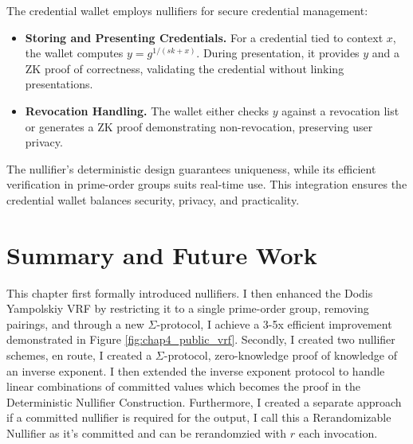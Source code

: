 The credential wallet employs nullifiers for secure credential management:

\begin{itemize}
    \item \textbf{Storing and Presenting Credentials.} For a credential tied to context $x$, the wallet computes $y = g^{1/(sk + x)}$. During presentation, it provides $y$ and a ZK proof of correctness, validating the credential without linking presentations.
    \item \textbf{Revocation Handling.} The wallet either checks $y$ against a revocation list or generates a ZK proof demonstrating non-revocation, preserving user privacy.
\end{itemize}

The nullifier’s deterministic design guarantees uniqueness, while its efficient verification in prime-order groups suits real-time use. This integration ensures the credential wallet balances security, privacy, and practicality.


\section{Summary and Future Work}

This chapter first formally introduced nullifiers. I then enhanced the Dodis Yampolskiy VRF by restricting it to a single prime-order group, removing pairings, and through a new $\Sigma$-protocol, I achieve a 3-5x efficient improvement demonstrated in Figure \ref{fig:chap4_public_vrf}. Secondly, I created two nullifier schemes, en route, I created a $\Sigma$-protocol, zero-knowledge proof of knowledge of an inverse exponent. I then extended the inverse exponent protocol to handle linear combinations of committed values which becomes the proof in the Deterministic Nullifier Construction. Furthermore, I created a separate approach if a committed nullifier is required for the output, I call this a Rerandomizable Nullifier as it's committed and can be rerandomzied with $r$ each invocation. 

